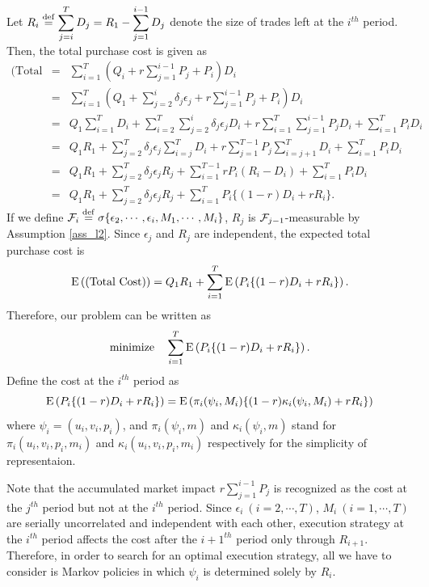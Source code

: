 Let $\displaystyle R_i \stackrel{\mathrm{def}}{=} \sum_{j=i}^T D_j = R_1 - \sum_{j=1}^{i-1} D_j$ denote the size of trades left at the $i^{th}$ period.  Then, the total purchase cost is given as
\begin{eqnarray*}
  \mbox{(Total Cost)}
   & = & \sum_{i=1}^T \left( Q_i + r \sum_{j=1}^{i-1} P_j + P_i \right) D_i \nonumber \\
   & = & \sum_{i=1}^T \left( Q_1 + \sum_{j=2}^i \delta_j \epsilon_j + r \sum_{j=1}^{i-1} P_j + P_i \right) D_i \nonumber \\
   & = & Q_1 \sum_{i=1}^T D_i + \sum_{i=2}^T \sum_{j=2}^i \delta_j \epsilon_j D_i + r \sum_{i=1}^T \sum_{j=1}^{i-1} P_j D_i + \sum_{i=1}^T P_i D_i \nonumber \\
   & = & Q_1 R_1 + \sum_{j=2}^T \delta_j \epsilon_j \sum_{i=j}^T D_i + r \sum_{j=1}^{T-1} P_j \sum_{i=j+1}^{T} D_i + \sum_{i=1}^T P_i D_i \nonumber \\
   & = & Q_1 R_1 + \sum_{j=2}^T \delta_j \epsilon_j R_j + \sum_{i=1}^{T-1} r P_i (R_i-D_i) + \sum_{i=1}^T P_i D_i \nonumber \\
   & = & Q_1 R_1 + \sum_{j=2}^T \delta_j \epsilon_j R_j + \sum_{i=1}^T P_i \{(1-r) D_i +r R_i\}. \label{eq_l9}
\end{eqnarray*}
If we define ${\cal F}_i \stackrel{\mathrm{def}}{=} \sigma \{ \epsilon_2, \cdots, \epsilon_i, M_1, \cdots, M_i \}$, $R_j$ is ${\cal F}_{j-1}$-measurable by Assumption \ref{ass_l2}.  Since $\epsilon_j$ and $R_j$ are independent, the expected total purchase cost is 
\[ %
 \ex{\mbox{(Total Cost)}}= Q_1 R_1 + \sum_{i=1}^T \ex{P_i \{(1-r) D_i +r R_i\}}.
\] %
Therefore, our problem can be written as
\begin{equation}\label{eq_l11}
  \mbox{minimize} \quad \sum_{i=1}^T {\mathrm{E}}\left( P_i \{(1-r) D_i +r R_i\} \right).
\end{equation}  
Define the cost at the $i^{th}$ period as
\[ %
  \ex{P_i \{(1-r) D_i +r R_i\}} = \ex{\pi_i(\psi_i,M_i) \{(1-r) \kappa_i(\psi_i,M_i) +r R_i\}}
\] %
where $\psi_i=(u_i,v_i,p_i)$, and $\pi_i(\psi_i,m)$ and $\kappa_i(\psi_i,m)$ stand for $\pi_i(u_i,v_i,p_i,m_i)$ and $\kappa_i(u_i,v_i,p_i,m_i)$ respectively for the simplicity of representaion.

Note that the accumulated market impact $\displaystyle r \sum_{j=1}^{i-1} P_j$ is recognized as the cost at the $j^{th}$ period but not at the $i^{th}$ period.  Since $\epsilon_i\ (i=2,\cdots,T)$, $M_i\ (i=1,\cdots,T)$ are serially uncorrelated and independent with each other, execution strategy at the $i^{th}$ period affects the cost after the $i+1^{th}$ period only through $R_{i+1}$.  Therefore, in order to search for an optimal execution strategy, all we have to consider is Markov policies in which $\psi_i$ is determined solely by $R_i$.  

